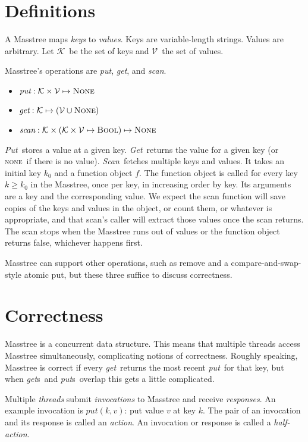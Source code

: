 \documentclass[11pt]{article}
\newcommand{\Keyset}{\ensuremath{\mathcal K}}
\newcommand{\Valueset}{\ensuremath{\mathcal V}}
\newcommand{\None}{\textsc{None}}
\newcommand{\NONE}{\textsc{none}}
\newcommand{\Bool}{\textsc{Bool}}
\newcommand{\sysGet}{\textit{Get}}
\newcommand{\sysget}{\textit{get}}
\newcommand{\sysgets}{\textit{get\/}s}
\newcommand{\sysPut}{\textit{Put}}
\newcommand{\sysput}{\textit{put}}
\newcommand{\sysputs}{\textit{put\/}s}
\newcommand{\sysScan}{\textit{Scan}}
\newcommand{\sysscan}{\textit{scan}}
\begin{document}
\section{Definitions}

A Masstree maps \emph{keys} to \emph{values}. Keys are variable-length strings. Values are arbitrary.
Let \Keyset\ be the set of keys and \Valueset\ the set of values.

Masstree's operations are \sysput, \sysget, and \sysscan.

\begin{itemize}
\item \(\sysput : \Keyset \times \Valueset \mapsto \None\)
\item \(\sysget : \Keyset \mapsto (\Valueset \cup \None)\)
\item \(\sysscan : \Keyset \times (\Keyset \times \Valueset \mapsto \Bool) \mapsto \None\)
\end{itemize}

\noindent%
\sysPut\
stores a value at a given key. \sysGet\ returns the value for a given
key (or \NONE\ if there is no value). \sysScan\ fetches multiple keys
and values. It takes an initial key $k_0$ and a function object $f$.
The function object is called for every key $k \geq k_0$ in the
Masstree, once per key, in increasing order by key. Its arguments are
a key and the corresponding value. We expect the scan function will
save copies of the keys and values in the object, or count them, or
whatever is appropriate, and that scan's caller will extract those
values once the scan returns. The scan stops when the Masstree
runs out of values or the function object returns false, whichever
happens first.

Masstree can support other operations, such as remove and a compare-and-swap-style atomic put, but these three suffice to discuss correctness.


\section{Correctness}

Masstree is a concurrent data structure. This means that multiple threads access Masstree simultaneously, complicating notions of correctness. Roughly speaking, Masstree is correct if every \sysget\ returns the most recent \sysput\ for that key, but when \sysgets\ and \sysputs\ overlap this gets a little complicated.

Multiple \emph{threads} submit \emph{invocations} to Masstree and
receive \emph{responses}. An example invocation is \(\sysput(k,v)\): put
value $v$ at key $k$. The pair of an invocation and its response is
called an \emph{action}. An invocation or response is
called a \emph{half-action}.
\end{document}

